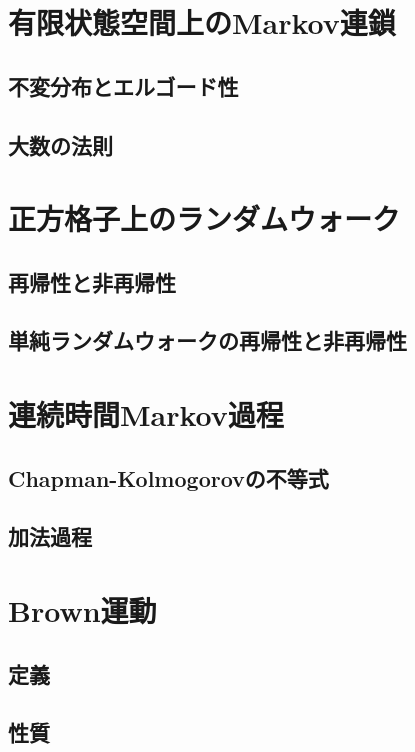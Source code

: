 \documentclass[uplatex,dvipdfmx]{jsreport}
\begin{document}
\section{有限状態空間上のMarkov連鎖}

\subsection{不変分布とエルゴード性}

\subsection{大数の法則}

\section{正方格子上のランダムウォーク}

\subsection{再帰性と非再帰性}

\subsection{単純ランダムウォークの再帰性と非再帰性}

\section{連続時間Markov過程}

\subsection{Chapman-Kolmogorovの不等式}

\subsection{加法過程}

\section{Brown運動}

\subsection{定義}

\subsection{性質}
\end{document}
